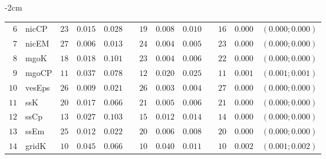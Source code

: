 \begin{table*}[!htbp]
\begin{adjustwidth*}{}{-2cm}
\begin{tabular}{@{}rlrrrrrrrrrcc@{}}
\footnotesize{$6 $} & \footnotesize{nicCP    } & \footnotesize{$23$} & \footnotesize{$0.015$} & \footnotesize{$0.028$} && \footnotesize{$19$} & \footnotesize{$0.008$} & \footnotesize{$0.010$} && \footnotesize{$16$} & \footnotesize{$0.000$} & \footnotesize{$(0.000;0.000)$} \\
\footnotesize{$7 $} & \footnotesize{nicEM    } & \footnotesize{$27$} & \footnotesize{$0.006$} & \footnotesize{$0.013$} && \footnotesize{$24$} & \footnotesize{$0.004$} & \footnotesize{$0.005$} && \footnotesize{$23$} & \footnotesize{$0.000$} & \footnotesize{$(0.000;0.000)$} \\
\footnotesize{$8 $} & \footnotesize{mgoK     } & \footnotesize{$18$} & \footnotesize{$0.018$} & \footnotesize{$0.101$} && \footnotesize{$23$} & \footnotesize{$0.004$} & \footnotesize{$0.006$} && \footnotesize{$22$} & \footnotesize{$0.000$} & \footnotesize{$(0.000;0.000)$} \\
\footnotesize{$9 $} & \footnotesize{mgoCP    } & \footnotesize{$11$} & \footnotesize{$0.037$} & \footnotesize{$0.078$} && \footnotesize{$12$} & \footnotesize{$0.020$} & \footnotesize{$0.025$} && \footnotesize{$11$} & \footnotesize{$0.001$} & \footnotesize{$(0.001;0.001)$} \\
\footnotesize{$10$} & \footnotesize{vesEps   } & \footnotesize{$26$} & \footnotesize{$0.009$} & \footnotesize{$0.021$} && \footnotesize{$26$} & \footnotesize{$0.003$} & \footnotesize{$0.004$} && \footnotesize{$27$} & \footnotesize{$0.000$} & \footnotesize{$(0.000;0.000)$} \\
\footnotesize{$11$} & \footnotesize{ssK      } & \footnotesize{$20$} & \footnotesize{$0.017$} & \footnotesize{$0.066$} && \footnotesize{$21$} & \footnotesize{$0.005$} & \footnotesize{$0.006$} && \footnotesize{$21$} & \footnotesize{$0.000$} & \footnotesize{$(0.000;0.000)$} \\
\footnotesize{$12$} & \footnotesize{ssCp     } & \footnotesize{$13$} & \footnotesize{$0.027$} & \footnotesize{$0.103$} && \footnotesize{$15$} & \footnotesize{$0.012$} & \footnotesize{$0.014$} && \footnotesize{$14$} & \footnotesize{$0.000$} & \footnotesize{$(0.000;0.000)$} \\
\footnotesize{$13$} & \footnotesize{ssEm     } & \footnotesize{$25$} & \footnotesize{$0.012$} & \footnotesize{$0.022$} && \footnotesize{$20$} & \footnotesize{$0.006$} & \footnotesize{$0.008$} && \footnotesize{$20$} & \footnotesize{$0.000$} & \footnotesize{$(0.000;0.000)$} \\
\footnotesize{$14$} & \footnotesize{gridK    } & \footnotesize{$10$} & \footnotesize{$0.045$} & \footnotesize{$0.066$} && \footnotesize{$10$} & \footnotesize{$0.040$} & \footnotesize{$0.011$} && \footnotesize{$10$} & \footnotesize{$0.002$} & \footnotesize{$(0.001;0.002)$} \\

\end{tabular}
\end{adjustwidth*}
\end{table*}
